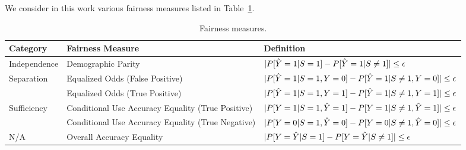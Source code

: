 \documentclass[manuscript,screen,review,anonymous]{acmart}
\DeclarePairedDelimiter{\abs}{\lvert}{\rvert}
\begin{document}
We consider in this work various fairness measures listed in Table~\ref{tab:measures}.

\begin{table}[h]
\caption{Fairness measures.}
\label{tab:measures}
\begin{tabular}{lll}
\toprule
\textbf{Category} & \textbf{Fairness Measure} & \textbf{Definition} \\
\midrule
\multirow{1}{*}{Independence}
& Demographic Parity & $\abs{P[\hat{Y} = 1 | S = 1] - P[\hat{Y} = 1 | S \neq 1]} \leq \epsilon$ \\
\multirow{2}{*}{Separation}
& \multirow{1}{*}{Equalized Odds (False Positive)} & $\abs{P[\hat{Y} = 1 | S = 1, Y = 0] - P[\hat{Y} = 1 | S \neq 1, Y = 0]} \leq \epsilon$ \\
& \multirow{1}{*}{Equalized Odds (True Positive)} & $\abs{P[\hat{Y} = 1 | S = 1, Y = 1] - P[\hat{Y} = 1 | S \neq 1, Y = 1]} \leq \epsilon$ \\
\multirow{2}{*}{Sufficiency}
& \multirow{1}{*}{Conditional Use Accuracy Equality (True Positive)} & $\abs{P[Y = 1 | S = 1, \hat{Y} = 1] - P[Y = 1 | S \neq 1, \hat{Y} = 1]} \leq \epsilon$ \\
& \multirow{1}{*}{Conditional Use Accuracy Equality (True Negative)} & $\abs{P[Y = 0 | S = 1, \hat{Y} = 0] - P[Y = 0 | S \neq 1, \hat{Y} = 0]} \leq \epsilon$ \\
\multirow{1}{*}{N/A}
& Overall Accuracy Equality & $\abs{P[Y = \hat{Y} | S = 1] - P[Y = \hat{Y} | S \neq 1]} \leq \epsilon$ \\
\bottomrule
\end{tabular}
\end{table}
\end{document}
